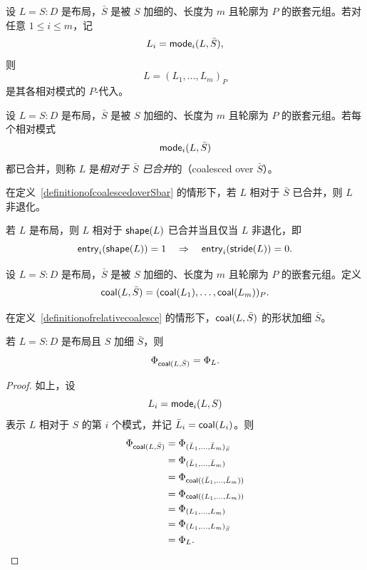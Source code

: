 \begin{observation}
    设 $L = S:D$ 是布局，$\bar{S}$ 是被 $S$ 加细的、长度为 $m$ 且轮廓为 $P$ 的嵌套元组。若对任意 $1 \leq i \leq m$，记
    \[
    L_i = \mathsf{mode}_i(L,\bar{S}),
    \]
    则
    \[
    L =(L_1,\dots,L_m)_P
    \]
    是其各相对模式的 $P$-代入。
\end{observation}

\begin{definition}\label{definitionofcoalescedoverSbar}
    设 $L = S:D$ 是布局，$\bar{S}$ 是被 $S$ 加细的、长度为 $m$ 且轮廓为 $P$ 的嵌套元组。若每个相对模式
    \[
    \mathsf{mode}_i(L,\bar{S})
    \]
    都已合并，则称 $L$ 是{\it 相对于 $\bar{S}$ 已合并}的（coalesced over $\bar{S}$）。
\end{definition}

\begin{observation}\label{coalescedoverSbarimpliesnondegenerate}
    在定义~\ref{definitionofcoalescedoverSbar} 的情形下，若 $L$ 相对于 $\bar{S}$ 已合并，则 $L$ 非退化。
\end{observation}

\begin{example}
    若 $L$ 是布局，则 $L$ 相对于 $\mathsf{shape}(L)$ 已合并当且仅当 $L$ 非退化，即
    \[
    \mathsf{entry}_i(\mathsf{shape}(L)) =1 \quad \Rightarrow \quad \mathsf{entry}_i(\mathsf{stride}(L)) = 0.
    \]
\end{example}

\begin{definition}[相对合并]\label{definitionofrelativecoalesce}
    设 $L = S:D$ 是布局，$ \bar{S}$ 是被 $S$ 加细的、长度为 $m$ 且轮廓为 $P$ 的嵌套元组。定义
    \[
    \mathsf{coal}(L,\bar{S}) = (\mathsf{coal}(L_1),\dots,\mathsf{coal}(L_m))_P.
    \]
\end{definition}

\begin{remark}
     在定义~\ref{definitionofrelativecoalesce} 的情形下，$\mathsf{coal}(L,\bar{S})$ 的形状加细 $\bar{S}$。
\end{remark}

\begin{lemma}\label{relativecoalescepreserveslayoutfunction}
    若 $L = S:D$ 是布局且 $S$ 加细 $\bar{S}$，则
    \[
    \Phi_{\mathsf{coal}(L,\bar{S})} = \Phi_L.
    \]
\end{lemma}

\begin{proof}
    如上，设
    \[
    L_i = \mathsf{mode}_i(L,S)
    \]
    表示 $L$ 相对于 $S$ 的第 $i$ 个模式，并记 $\bar{L}_i = \mathsf{coal}(L_i)$。则
    \begin{align*}
    \Phi_{\mathsf{coal}(L,\bar{S})} & = \Phi_{(\bar{L}_1,\dots,\bar{L}_m)_{\bar{S}}}\\
    & = \Phi_{(\bar{L}_1,\dots,\bar{L}_m)}\\
    & = \Phi_{\mathsf{coal}((\bar{L}_1,\dots,\bar{L}_m))}\\
    & = \Phi_{\mathsf{coal}((L_1,\dots,L_m))}\\
    & = \Phi_{(L_1,\dots,L_m)}\\
    & = \Phi_{(L_1,\dots,L_m)_{\bar{S}}}\\
    & = \Phi_L.
    \end{align*}
\end{proof}

